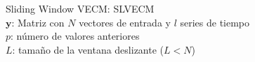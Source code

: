 \documentclass{beamer}
\begin{document}
\begin{frame}
\begin{columns}[T]
\begin{column}{.58\textwidth}
\begin{adjustbox}{max size={.95\textwidth}{.8\textheight}}
                \end{adjustbox}
            \end{column}%

            \hfill%
            \begin{column}{.38\textwidth}
            Sliding Window VECM: SLVECM \\
            $\mathbf{y}$: Matriz con $N$ vectores de entrada y $l$ series de tiempo\\
            $p$: número de valores anteriores \\
            $L$: tamaño de la ventana deslizante ($L<N$) \\
            \end{column}%
            \end{columns}
            \end{frame}
\end{document}

